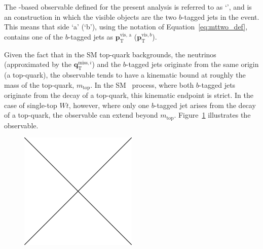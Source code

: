 The \mttwo-based observable defined for the present analysis is referred to as `\mtbb',
and is an \mttwo construction in which the visible objects are the two $b$-tagged jets in the event.
This means that side `a' (`b'), using the notation of Equation~\ref{eq:mttwo_def}, contains
one of the $b$-tagged jets as $\bm{p}_{\text{T}}^{\text{vis, a}}$ ($\bm{p}_{\text{T}}^{\text{vis}, b}$).

Given the fact that in the SM top-quark backgrounds, the neutrinos (approximated by the $\bm{q}_{\text{T}}^{\text{miss}, i}$)
and the $b$-tagged jets originate from the same origin (a top-quark), the \mtbb observable tends
to have a kinematic bound at roughly the mass of the top-quark, $m_{\text{top}}$.
In the SM \ttbar~process, where both $b$-tagged jets originate from the decay of a top-quark, this kinematic
endpoint is strict.
In the case of single-top $Wt$, however, where only one $b$-tagged jet arises from the decay of a
top-quark, the \mtbb observable can extend beyond $m_{\text{top}}$.
Figure~\ref{fig:hh_shape_mtbb} illustrates the \mtbb observable.

\begin{figure}[!htb]
    \begin{center}
        \includegraphics[width=0.5\textwidth]{figures/placeholder}
        \caption{
            \mtbb
        }
        \label{fig:hh_shape_mtbb}
    \end{center}
\end{figure}


